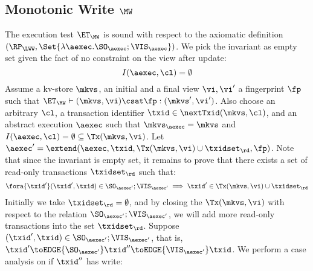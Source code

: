 \subsection{Monotonic Write \( \MW \)}
\label{sec:sound-complete-mw}

The execution test $\ET_\MW$ is sound with respect to the axiomatic definition 
$(\RP_{\LWW}, \Set{\lambda \aexec. \SO_{\aexec} ; \VIS_{\aexec} })$.
We pick the invariant as empty set given the fact of no constraint on the view after update:
\[ 
    I( \aexec, \cl ) = \emptyset 
\]
Assume a kv-store $\mkvs$, an initial and a final view $\vi, \vi'$  a fingerprint $\fp$ 
such that $\ET_{\MW} \vdash (\mkvs, \vi) \csat \fp: (\mkvs',\vi')$. 
Also choose an arbitrary $\cl$, a transaction identifier $\txid \in \nextTxid(\mkvs, \cl)$, 
and an abstract execution $\aexec$ such that $\mkvs_{\aexec} = \mkvs$ and 
\( I(\aexec, \cl) =  \emptyset \subseteq \Tx(\mkvs, \vi) \).
Let \( \aexec' = \extend(\aexec, \txid, \Tx(\mkvs, \vi) \cup \txidset_\rd, \fp ) \).
Note that since the invariant  is empty set, it remains to prove that there exists a set of read-only transactions \( \txidset_\rd \) such that:
\[
    \begin{array}{@{}l@{}}
        \fora{ \txid' }  (\txid' ,\txid)  \in \SO_{\aexec'} ; \VIS_{\aexec'}
        \implies \txid' \in \Tx(\mkvs, \vi) \cup \txidset_\rd
    \end{array}
\]
Initially we take \( \txidset_\rd = \emptyset \), 
and by closing the \( \Tx(\mkvs, \vi) \) with respect to the relation \( \SO_{\aexec'} ; \VIS_{\aexec'} \),
we will add more read-only transactions into the set \( \txidset_\rd\).
Suppose \( (\txid' ,\txid)  \in \SO_{\aexec'} ; \VIS_{\aexec'} \), 
that is, \( \txid' \toEDGE{\SO_{\aexec'}} \txid'' \toEDGE{\VIS_{\aexec'}} \txid \).
We perform a case analysis on if \( \txid'' \) has write:

